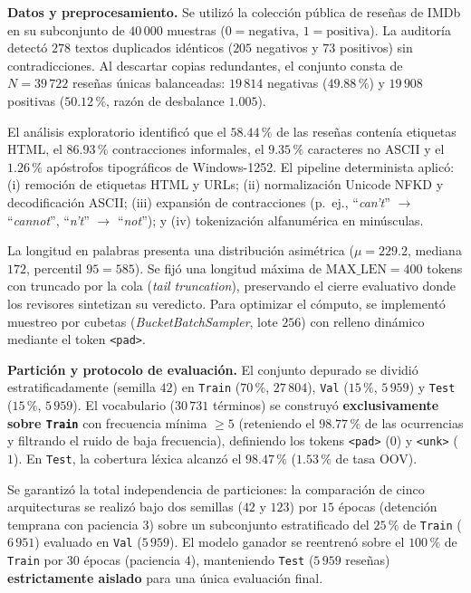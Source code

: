 \documentclass[letterpaper, 10 pt, conference]{ieeeconf}
\makeatletter
\def\section{\@startsection{section}{1}{\z@}{0.75ex plus 0.2ex minus 0.1ex}{0.20ex plus 0.10ex minus 0ex}{\normalfont\normalsize\centering\scshape}}
\makeatother
\begin{document}
\section{Metodología}

\textbf{Datos y preprocesamiento.} 
Se utilizó la colección pública de reseñas de IMDb \cite{c3} en su subconjunto de $40\,000$ muestras ($0=\text{negativa}$, $1=\text{positiva}$). La auditoría detectó $278$ textos duplicados idénticos ($205$ negativos y $73$ positivos) sin contradicciones. Al descartar copias redundantes, el conjunto consta de $N = 39\,722$ reseñas únicas balanceadas: $19\,814$ negativas ($49.88\,\%$) y $19\,908$ positivas ($50.12\,\%$, razón de desbalance $1.005$).

El análisis exploratorio identificó que el $58.44\,\%$ de las reseñas contenía etiquetas HTML, el $86.93\,\%$ contracciones informales, el $9.35\,\%$ caracteres no ASCII y el $1.26\,\%$ apóstrofos tipográficos de Windows-1252. El pipeline determinista aplicó: (i) remoción de etiquetas HTML y URLs; (ii) normalización Unicode NFKD y decodificación ASCII; (iii) expansión de contracciones (p.~ej., ``\textit{can't}'' $\to$ ``\textit{cannot}'', ``\textit{n't}'' $\to$ ``\textit{not}''); y (iv) tokenización alfanumérica en minúsculas.

La longitud en palabras presenta una distribución asimétrica ($\mu = 229.2$, mediana $172$, percentil $95 = 585$). Se fijó una longitud máxima de $\text{MAX\_LEN} = 400$ tokens con truncado por la cola (\textit{tail truncation}), preservando el cierre evaluativo donde los revisores sintetizan su veredicto. Para optimizar el cómputo, se implementó muestreo por cubetas (\textit{BucketBatchSampler}, lote $256$) con relleno dinámico mediante el token \texttt{<pad>}.

\textbf{Partición y protocolo de evaluación.} 
El conjunto depurado se dividió estratificadamente (semilla $42$) en \texttt{Train} ($70\,\%$, $27\,804$), \texttt{Val} ($15\,\%$, $5\,959$) y \texttt{Test} ($15\,\%$, $5\,959$). El vocabulario ($30\,731$ términos) se construyó \textbf{exclusivamente sobre \texttt{Train}} con frecuencia mínima $\ge 5$ (reteniendo el $98.77\,\%$ de las ocurrencias y filtrando el ruido de baja frecuencia), definiendo los tokens \texttt{<pad>} ($0$) y \texttt{<unk>} ($1$). En \texttt{Test}, la cobertura léxica alcanzó el $98.47\,\%$ ($1.53\,\%$ de tasa OOV).

Se garantizó la total independencia de particiones: la comparación de cinco arquitecturas se realizó bajo dos semillas ($42$ y $123$) por $15$ épocas (detención temprana con paciencia $3$) sobre un subconjunto estratificado del $25\,\%$ de \texttt{Train} ($6\,951$) evaluado en \texttt{Val} ($5\,959$). El modelo ganador se reentrenó sobre el $100\,\%$ de \texttt{Train} por $30$ épocas (paciencia $4$), manteniendo \texttt{Test} ($5\,959$ reseñas) \textbf{estrictamente aislado} para una única evaluación final.
\end{document}
